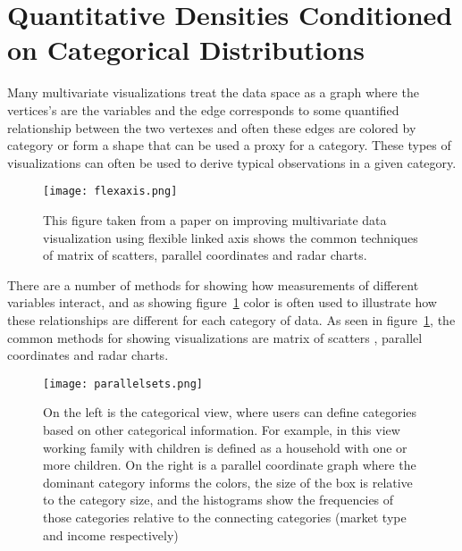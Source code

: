 \documentclass[../main.text]{subfiles}
\begin{document}
\section{Quantitative Densities Conditioned on Categorical Distributions}



Many multivariate visualizations treat the data space as a graph where the vertices's are the variables and the edge corresponds to some quantified relationship between the two vertexes and often these edges are colored by category or form a shape that can be used a proxy for a category. These types of visualizations can often be used to derive typical observations in a given category.


\begin{figure}
  \texttt{[image: flexaxis.png]}
  \caption{This figure taken from a paper on improving multivariate data visualization using flexible linked axis \cite{claessen_flexible_2011} shows the common techniques of matrix of scatters, parallel coordinates and radar charts.}
  \label{fig:flexlink}
\end{figure}

There are a number of methods for showing how measurements of different
variables interact, and as showing figure~\ref{fig:flexlink} color is often
used to illustrate how these relationships are different for each category of
data. As seen in figure~\ref{fig:flexlink}, the common methods for showing
visualizations are matrix of scatters \cite{elmqvist_rolling_2008} , parallel
coordinates \cite{inselberg_plane_1985, wegman_hyperdimensional_1990} and radar charts\cite{chambers_graphical_1983}.

\begin{figure}
  \texttt{[image: parallelsets.png]}
  \caption{On the left is the categorical view, where users can define
    categories based on other categorical information. For example, in this
    view working family with children is defined as a household with one or
    more children. On the right is a parallel coordinate graph where the
    dominant category informs the colors, the size of the box is relative to
    the category size, and the histograms show the frequencies of those
    categories relative to the connecting categories (market type and income
    respectively)}
  \label{fig:parallelsets}
\end{figure}
\end{document}
